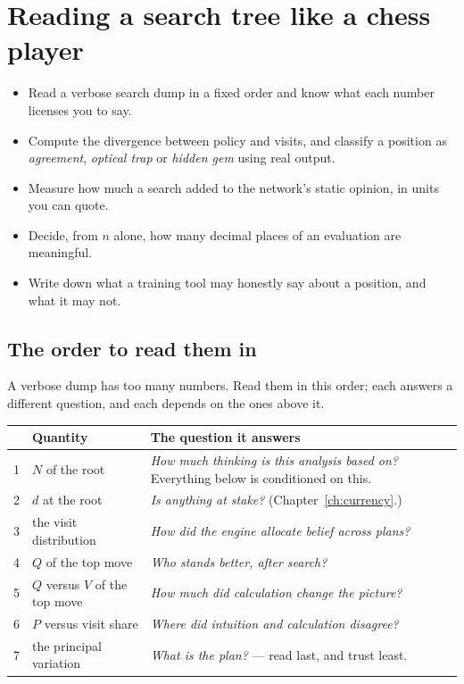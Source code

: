 \chapter{Reading a search tree like a chess player}
\label{ch:readingtree}

\begin{objectives}
\begin{itemize}
\item Read a verbose search dump in a fixed order and know what each number licenses you to
  say.
\item Compute the divergence between policy and visits, and classify a position as
  \emph{agreement}, \emph{optical trap} or \emph{hidden gem} using real output.
\item Measure how much a search added to the network's static opinion, in units you can
  quote.
\item Decide, from $n$ alone, how many decimal places of an evaluation are meaningful.
\item Write down what a training tool may honestly say about a position, and what it may not.
\end{itemize}
\end{objectives}

\section{The order to read them in}

A verbose dump has too many numbers. Read them in this order; each answers a different
question, and each depends on the ones above it.

\begin{center}
\begin{tabular}{@{}rlp{8.3cm}@{}}
\toprule
 & Quantity & The question it answers \\
\midrule
1 & $N$ of the root & \emph{How much thinking is this analysis based on?} Everything below is
  conditioned on this. \\
2 & $d$ at the root & \emph{Is anything at stake?} (Chapter~\ref{ch:currency}.) \\
3 & the visit distribution & \emph{How did the engine allocate belief across plans?} \\
4 & $Q$ of the top move & \emph{Who stands better, after search?} \\
5 & $Q$ versus $V$ of the top move & \emph{How much did calculation change the picture?} \\
6 & $P$ versus visit share & \emph{Where did intuition and calculation disagree?} \\
7 & the principal variation & \emph{What is the plan?} --- read last, and trust least. \\
\bottomrule
\end{tabular}
\end{center}

